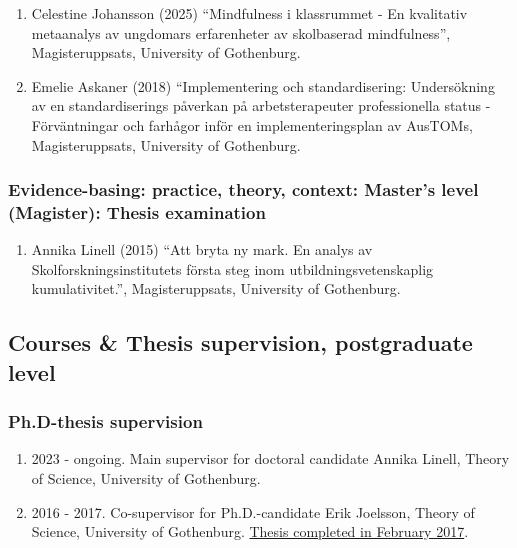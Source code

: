 \documentclass[
]{article}
\providecommand{\tightlist}{%
  \setlength{\itemsep}{0pt}\setlength{\parskip}{0pt}}
\begin{document}
\begin{enumerate}
\def\labelenumi{\arabic{enumi}.}
\tightlist
\item
  Celestine Johansson (2025) ``Mindfulness i klassrummet - En kvalitativ
  metaanalys av ungdomars erfarenheter av skolbaserad mindfulness'',
  Magisteruppsats, University of Gothenburg.
\item
  Emelie Askaner (2018) ``Implementering och standardisering:
  Undersökning av en standardiserings påverkan på arbetsterapeuter
  professionella status - Förväntningar och farhågor inför en
  implementeringsplan av AusTOMs, Magisteruppsats, University of
  Gothenburg.
\end{enumerate}

\hypertarget{evidence-basing-practice-theory-context-masters-level-magister-thesis-examination}{%
\subsubsection{Evidence-basing: practice, theory, context: Master's
level (Magister): Thesis
examination}\label{evidence-basing-practice-theory-context-masters-level-magister-thesis-examination}}

\begin{enumerate}
\def\labelenumi{\arabic{enumi}.}
\tightlist
\item
  Annika Linell (2015) ``Att bryta ny mark. En analys av
  Skolforskningsinstitutets första steg inom utbildningsvetenskaplig
  kumulativitet.'', Magisteruppsats, University of Gothenburg.
\end{enumerate}

\hypertarget{courses-thesis-supervision-postgraduate-level}{%
\subsection{Courses \& Thesis supervision, postgraduate
level}\label{courses-thesis-supervision-postgraduate-level}}

\hypertarget{ph.d-thesis-supervision}{%
\subsubsection{Ph.D-thesis supervision}\label{ph.d-thesis-supervision}}

\begin{enumerate}
\def\labelenumi{\arabic{enumi}.}
\tightlist
\item
  2023 - ongoing. Main supervisor for doctoral candidate Annika Linell,
  Theory of Science, University of Gothenburg.
\item
  2016 - 2017. Co-supervisor for Ph.D.-candidate Erik Joelsson, Theory
  of Science, University of Gothenburg.
  \href{https://gupea.ub.gu.se/handle/2077/51493}{Thesis completed in
  February 2017}.
\end{enumerate}
\end{document}
